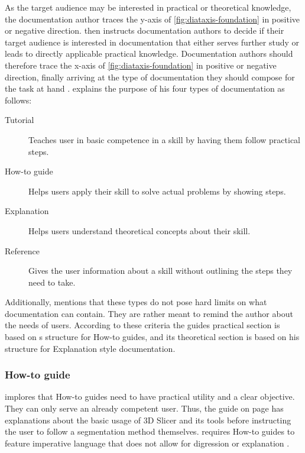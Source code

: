 As the target audience may be interested in practical or theoretical knowledge, the documentation author traces the y-axis of \cref{fig:diataxis-foundation} in positive or negative direction.
\citeauthor{procidaDiataxisDocumentationFramework2023} then instructs documentation authors to decide if their target audience is interested in documentation that either serves further study or leads to directly applicable practical knowledge.
Documentation authors should therefore trace the x-axis of \cref{fig:diataxis-foundation} in positive or negative direction, finally arriving at the type of documentation they should compose for the task at hand \cite{procidaPythonDocsCommunity2022}.
\citeauthor{procidaDiataxisDocumentationFramework2023} explains the purpose of his four types of documentation as follows:
\begin{description}
	\item[Tutorial] Teaches user in basic competence in a skill by having them follow practical steps.
	\item[How-to guide] Helps users apply their skill to solve actual problems by showing steps.
	\item[Explanation] Helps users understand theoretical concepts about their skill.
	\item[Reference] Gives the user information about a skill without outlining the steps they need to take.
\end{description}
Additionally, \citeauthor{procidaDiataxisDocumentationFramework2023} mentions that these types do not pose hard limits on what documentation can contain. They are rather meant to remind the author about the needs of users.
According to these criteria the guides practical section is based on \citeauthor{procidaDiataxisDocumentationFramework2023}s structure for How-to guides, and its theoretical section is based on his structure for Explanation style documentation.

\subsubsection*{How-to guide}
\citeauthor{procidaDiataxisDocumentationFramework2023} implores that How-to guides need to have practical utility and a clear objective.
They can only serve an already competent user.
Thus, the guide on page \pageref{a:guide} has explanations about the basic usage of 3D Slicer and its tools before instructing the user to follow a segmentation method themselves.
\citeauthor{procidaDiataxisDocumentationFramework2023} requires How-to guides to feature imperative language that does not allow for digression or explanation \cite{procidaPythonDocsCommunity2022,procidaDiataxisDocumentationFramework2023}.

